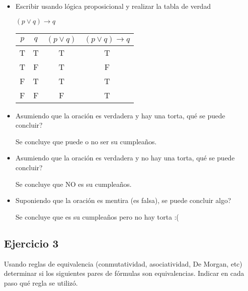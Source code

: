 \begin{itemize}
    \item Escribir usando lógica proposicional y realizar la tabla de verdad

          $(p \lor q) \to q$

          \begin{tabular}{|c|c|c|c|}
              \hline
              $p$ & $q$ & $(p \lor q)$ & $(p \lor q) \to q$ \\
              \hline
              T   & T   & T            & T                  \\
              \hline
              T   & F   & T            & F                  \\
              \hline
              F   & T   & T            & T                  \\
              \hline
              F   & F   & F            & T                  \\
              \hline
          \end{tabular}

    \item Asumiendo que la oración es verdadera y hay una torta, qué se puede concluir?

          Se concluye que puede o no ser su cumpleaños.

    \item Asumiendo que la oración es verdadera y no hay una torta, qué se puede concluir?

          Se concluye que NO es su cumpleaños.

    \item Suponiendo que la oración es mentira (es falsa), se puede concluir algo?

          Se concluye que es su cumpleaños pero no hay torta :(
\end{itemize}

\subsection{Ejercicio 3}
Usando reglas de equivalencia (conmutatividad, asociatividad, De Morgan, etc) determinar si los siguientes pares de fórmulas son equivalencias. Indicar en cada paso qué regla se utilizó.

